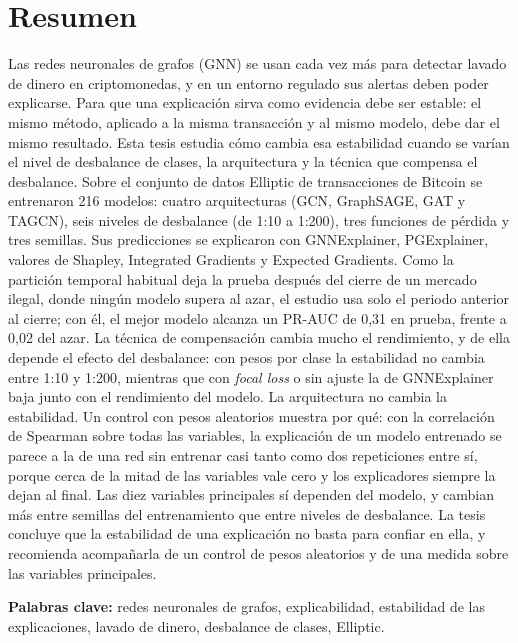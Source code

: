 \chapter*{Resumen}

Las redes neuronales de grafos (GNN) se usan cada vez más para detectar lavado de dinero en
criptomonedas, y en un entorno regulado sus alertas deben poder explicarse. Para que una
explicación sirva como evidencia debe ser estable: el mismo método, aplicado a la misma
transacción y al mismo modelo, debe dar el mismo resultado. Esta tesis estudia cómo cambia esa
estabilidad cuando se varían el nivel de desbalance de clases, la arquitectura y la técnica que
compensa el desbalance. Sobre el conjunto de datos Elliptic de transacciones de Bitcoin se
entrenaron 216 modelos: cuatro arquitecturas (GCN, GraphSAGE, GAT y TAGCN), seis niveles de
desbalance (de 1:10 a 1:200), tres funciones de pérdida y tres semillas. Sus predicciones se
explicaron con GNNExplainer, PGExplainer, valores de Shapley, Integrated Gradients y Expected
Gradients. Como la partición temporal habitual deja la prueba después del cierre de un mercado
ilegal, donde ningún modelo supera al azar, el estudio usa solo el periodo anterior al cierre;
con él, el mejor modelo alcanza un PR-AUC de 0,31 en prueba, frente a 0,02 del azar. La técnica
de compensación cambia mucho el rendimiento, y de ella depende el efecto del desbalance: con
pesos por clase la estabilidad no cambia entre 1:10 y 1:200, mientras que con \textit{focal
loss} o sin ajuste la de GNNExplainer baja junto con el rendimiento del modelo. La arquitectura
no cambia la estabilidad. Un control con pesos
aleatorios muestra por qué: con la correlación de Spearman sobre todas las variables, la
explicación de un modelo entrenado se parece a la de una red sin entrenar casi tanto como dos
repeticiones entre sí, porque cerca de la mitad de las variables vale cero y los explicadores
siempre la dejan al final. Las diez variables principales sí dependen del modelo, y cambian más
entre semillas del entrenamiento que entre niveles de desbalance. La tesis concluye que la
estabilidad de una explicación no basta para confiar en ella, y recomienda acompañarla de un
control de pesos aleatorios y de una medida sobre las variables principales.

\vspace{0.4cm}
\noindent\textbf{Palabras clave:} redes neuronales de grafos, explicabilidad, estabilidad de
las explicaciones, lavado de dinero, desbalance de clases, Elliptic.


